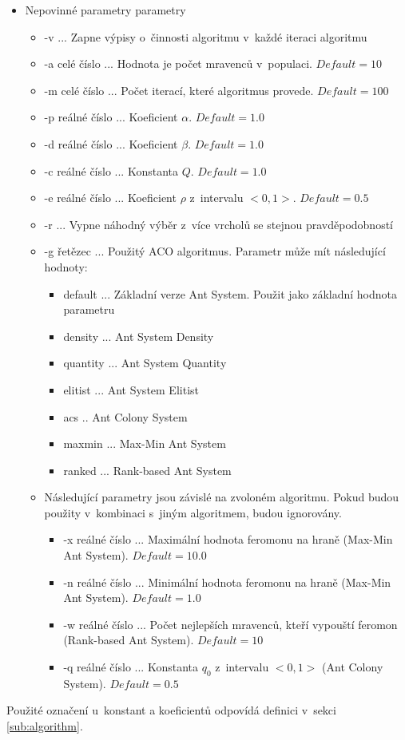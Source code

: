 \documentclass[a4paper, 12pt]{article}
\newcommand{\defVal}[1]{$Default=#1$}
\begin{document}
  \begin{itemize}
    \item Nepovinné parametry parametry
    \begin{itemize}
      \item -v ... Zapne výpisy o~činnosti algoritmu v~každé iteraci algoritmu
      \item -a celé číslo ... Hodnota je počet mravenců v~populaci. \defVal{10}
      \item -m celé číslo ... Počet iterací, které algoritmus provede. \defVal{100}
      \item -p reálné číslo ...  Koeficient $\alpha$. \defVal{1.0}
      \item -d reálné číslo ... Koeficient $\beta$. \defVal{1.0}
      \item -c reálné číslo ... Konstanta $Q$. \defVal{1.0}
      \item -e reálné číslo ... Koeficient $\rho$ z~intervalu $<0,1>$. \defVal{0.5}
      \item -r ... Vypne náhodný výběr z~více vrcholů se stejnou pravděpodobností
      \item -g řetězec ... Použitý ACO algoritmus. Parametr může mít následující hodnoty:
      \begin{itemize}
       \item default ... Základní verze Ant System. Použit jako základní hodnota parametru
       \item density ... Ant System Density
       \item quantity ... Ant System Quantity
       \item elitist ... Ant System Elitist
       \item acs .. Ant Colony System
       \item maxmin ... Max-Min Ant System
       \item ranked ... Rank-based Ant System
      \end{itemize}
      \item Následující parametry jsou závislé na zvoloném algoritmu. Pokud budou použity v~kombinaci s~jiným algoritmem, budou ignorovány.
      \begin{itemize}
        \item -x reálné číslo ... Maximální hodnota feromonu na hraně (Max-Min Ant System). \defVal{10.0}
        \item -n reálné číslo ... Minimální hodnota feromonu na hraně (Max-Min Ant System). \defVal{1.0}
        \item -w reálné číslo ... Počet nejlepších mravenců, kteří vypouští feromon (Rank-based Ant System). \defVal{10}
        \item -q reálné číslo ... Konstanta $q_0$ z~intervalu $<0,1>$ (Ant Colony System). \defVal{0.5}
      \end{itemize}
    \end{itemize}
  \end{itemize}
Použité označení u~konstant a koeficientů odpovídá definici v~sekci \ref{sub:algorithm}.
\end{document}
